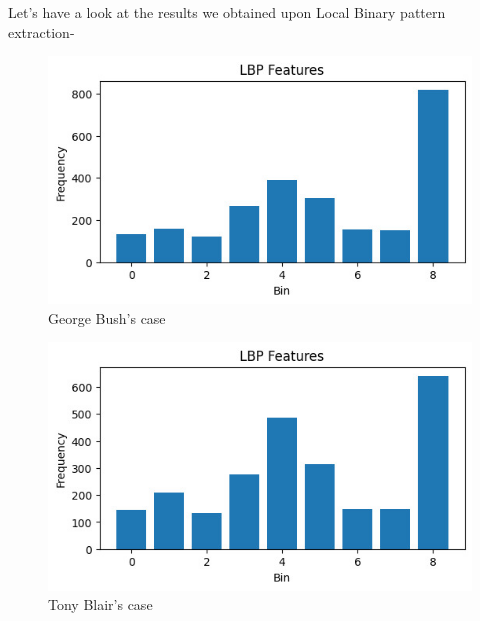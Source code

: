 \documentclass[a4paper]{article}
\theoremstyle{plain}
\theoremstyle{definition}
\begin{document}
 Let's have a look at the results we obtained upon Local Binary pattern extraction-
 \begin{figure}[H]
     \centering
     \includegraphics[width=1\linewidth]{WhatsApp Image 2024-04-21 at 14.23.53_79ad58bf.jpg}
     \caption{George Bush's case}
     \label{fig:enter-label}
 \end{figure}
 \begin{figure}[H]
     \centering
     \includegraphics[width=1\linewidth]{WhatsApp Image 2024-04-21 at 14.24.04_e4267b1a.jpg}
     \caption{Tony Blair's case}
     \label{fig:enter-label}
 \end{figure}
\end{document}
